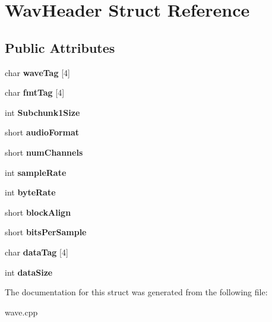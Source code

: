 \hypertarget{struct_wav_header}{
\section{WavHeader Struct Reference}
\label{struct_wav_header}
}
\subsection*{Public Attributes}
\begin{DoxyCompactItemize}
\item 
\hypertarget{struct_wav_header_ad12ee1a19f7bb81ad702d6abb8e61d85}{
char {\bfseries waveTag} \mbox{[}4\mbox{]}}
\label{struct_wav_header_ad12ee1a19f7bb81ad702d6abb8e61d85}

\item 
\hypertarget{struct_wav_header_a28b241e83f636464281cd4d2b246f280}{
char {\bfseries fmtTag} \mbox{[}4\mbox{]}}
\label{struct_wav_header_a28b241e83f636464281cd4d2b246f280}

\item 
\hypertarget{struct_wav_header_a986d76d500914f370cddfa6c2f1542d2}{
int {\bfseries Subchunk1Size}}
\label{struct_wav_header_a986d76d500914f370cddfa6c2f1542d2}

\item 
\hypertarget{struct_wav_header_af052ba52da4a1bda137ce0171f3d763e}{
short {\bfseries audioFormat}}
\label{struct_wav_header_af052ba52da4a1bda137ce0171f3d763e}

\item 
\hypertarget{struct_wav_header_a974f24ee8f6c0f7a6a881b1b5f917bfa}{
short {\bfseries numChannels}}
\label{struct_wav_header_a974f24ee8f6c0f7a6a881b1b5f917bfa}

\item 
\hypertarget{struct_wav_header_a70f6545b7646e8f9c2f02118150566d1}{
int {\bfseries sampleRate}}
\label{struct_wav_header_a70f6545b7646e8f9c2f02118150566d1}

\item 
\hypertarget{struct_wav_header_ab9c193dd57da1a877cd5193657ed8a75}{
int {\bfseries byteRate}}
\label{struct_wav_header_ab9c193dd57da1a877cd5193657ed8a75}

\item 
\hypertarget{struct_wav_header_a1bfbf825695b7626f58e64355a3ee4b1}{
short {\bfseries blockAlign}}
\label{struct_wav_header_a1bfbf825695b7626f58e64355a3ee4b1}

\item 
\hypertarget{struct_wav_header_a2dbf27f9cd07e02e744d4f71bc25109b}{
short {\bfseries bitsPerSample}}
\label{struct_wav_header_a2dbf27f9cd07e02e744d4f71bc25109b}

\item 
\hypertarget{struct_wav_header_a7f07365285e299b1014b1e3add1fc271}{
char {\bfseries dataTag} \mbox{[}4\mbox{]}}
\label{struct_wav_header_a7f07365285e299b1014b1e3add1fc271}

\item 
\hypertarget{struct_wav_header_a501041ecccd8debd17d35e5d59844164}{
int {\bfseries dataSize}}
\label{struct_wav_header_a501041ecccd8debd17d35e5d59844164}

\end{DoxyCompactItemize}


The documentation for this struct was generated from the following file:\begin{DoxyCompactItemize}
\item 
wave.cpp\end{DoxyCompactItemize}

